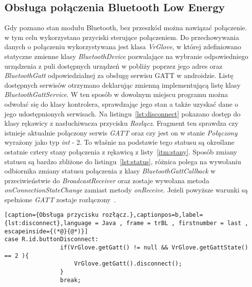 	\subsection{Obsługa połączenia Bluetooth Low Energy}
	\label{subsec:ble}
	Gdy poznano stan modułu Bluetooth, bez przeszkód można nawiązać połączenie. w tym celu wykorzystano przyciski sterujące połączeniem. Do przechowywania danych o połączeniu wykorzystywana jest klasa \textit{VrGlove}, w której zdefiniowano statyczne zmienne klasy \textit{BluetoothDevice} pozwalające na wybranie odpowiedniego urządzenia z puli dostępnych urządzeń w pobliży poprzez jego adres oraz \textit{BluetoothGatt} odpowiedzialnej za obsługę serwisu GATT w androidzie. Listę dostępnych serwisów otrzymano deklarując zmienną implementującą listę klasy  \textit{BluetoothGattService}. W ten sposób w dowolnym miejscu programu można odwołać się do klasy kontrolera, sprawdzając jego stan a także uzyskać dane o jego udostępnionych serwisach. Na listingu~\ref{lst:disconnect} pokazano dostęp do klasy rękawicy z nasłuchiwacza przycisku \textit{Rozłącz}. Fragment ten sprawdza czy istnieje aktualnie połączony serwis \textit{GATT} oraz czy jest on w stanie \textit{Połączony} wyrażony jako typ \textit{int} - 2. To właśnie na podstawie tego statusu są określane ostatnie cztery stany połączenia z rękawicą z listy~\ref{itm:stany}. Sposób zmiany statusu są bardzo zbliżone do listingu~\ref{lst:status}, różnica polega na wywołaniu odbiornika zmiany statusu połączenia z klasy \textit{BluetoothGattCallback} w przeciwieństwie do \textit{BroadcastReceiver} oraz zostaje wywołana metoda \textit{onConnectionStateChange} zamiast metody \textit{onReceive}. Jeżeli powyższe warunki są spełnione \textit{GATT} zostaje rozłączony~\cite{AndroidDoc}. 
\begin{lstlisting}[caption={Obsługa przycisku rozłącz.},captionpos=b,label={lst:disconnect},language = Java , frame = trBL , firstnumber = last , escapeinside={(*@}{@*)}]
case R.id.buttonDisconnect:
                if(VrGlove.getGatt() != null && VrGlove.getGattState() == 2 ){
                    VrGlove.getGatt().disconnect();
                }
                break;                    
\end{lstlisting}	
